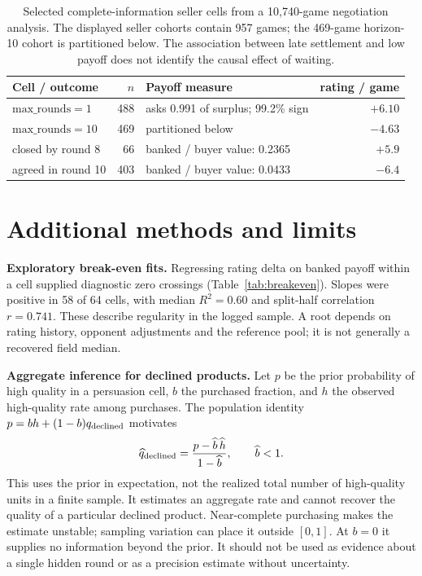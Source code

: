 \documentclass{article}
\begin{document}
\begin{table}[H]
\centering\small
\caption{Selected complete-information seller cells from a 10,740-game
negotiation analysis. The displayed seller cohorts contain 957 games; the
469-game horizon-10 cohort is partitioned below. The association between late
settlement and low payoff does not identify the causal effect of waiting.}
\label{tab:endgame}
\begin{tabular}{@{}lrlr@{}}
\toprule
Cell / outcome & $n$ & Payoff measure & rating / game\\
\midrule
$\mathrm{max\_rounds}=1$ & 488 & asks 0.991 of surplus; 99.2\% sign & $+6.10$\\
$\mathrm{max\_rounds}=10$ & 469 & partitioned below & $-4.63$\\
\quad closed by round 8 & 66 & banked / buyer value: 0.2365 & $+5.9$\\
\quad agreed in round 10 & 403 & banked / buyer value: 0.0433 & $-6.4$\\
\bottomrule
\end{tabular}
\end{table}

\section{Additional methods and limits}
\label{app:lim}
\textbf{Exploratory break-even fits.} Regressing rating delta on banked payoff
within a cell supplied diagnostic zero crossings (Table~\ref{tab:breakeven}).
Slopes were positive in 58 of 64 cells, with median $R^2=0.60$ and split-half
correlation $r=0.741$. These describe regularity in the logged sample. A root
depends on rating history, opponent adjustments and the reference pool; it is
not generally a recovered field median.

\textbf{Aggregate inference for declined products.} Let $p$ be the prior
probability of high quality in a persuasion cell, $b$ the purchased fraction,
and $h$ the observed high-quality rate among purchases. The population identity
$p=bh+(1-b)q_{\rm declined}$ motivates
\[
\widehat q_{\rm declined}=\frac{p-\widehat b\,\widehat h}{1-\widehat b},
\qquad \widehat b<1.
\]
This uses the prior in expectation, not the realized total number of high-quality
units in a finite sample. It estimates an aggregate rate and cannot recover the
quality of a particular declined product. Near-complete purchasing makes the
estimate unstable; sampling variation can place it outside $[0,1]$. At $b=0$
it supplies no information beyond the prior. It should not be used as evidence
about a single hidden round or as a precision estimate without uncertainty.
\end{document}
